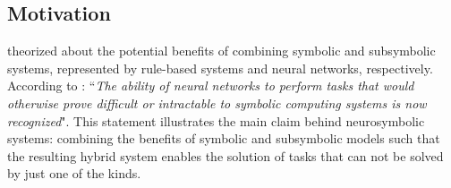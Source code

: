 \subsection{Motivation}\label{2_sec:subsec:motivation}
\cite{mcgarry_hybrid_1999} theorized about the potential benefits of combining symbolic and subsymbolic systems, represented by rule-based systems and neural networks, respectively. According to \cite{mcgarry_hybrid_1999}: ``\textit{The ability of neural networks to perform tasks that would otherwise prove difficult or intractable to symbolic computing systems is now recognized}". This statement illustrates the main claim behind neurosymbolic systems: combining the benefits of symbolic and subsymbolic models such that the resulting hybrid system enables the solution of tasks that can not be solved by just one of the kinds. 


